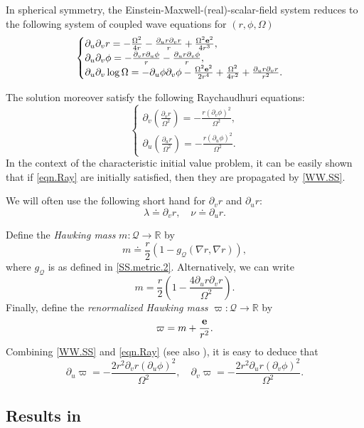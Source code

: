 \documentclass[10pt, reqno]{amsart}
\theoremstyle{definition}
\theoremstyle{remark}
\numberwithin{equation}{section}
\newcommand{\rd}{\partial}
\newcommand{\0}{\emptyset}
\newcommand{\Omg}{\Omega}
\newcommand{\f}{\frac}
\begin{document}
In spherical symmetry, the Einstein-Maxwell-(real)-scalar-field system reduces to the following system of coupled wave equations for $(r,\phi,\Omega)$
\begin{equation}\label{WW.SS}
\begin{cases}
\rd_u\rd_v r=-\f {\Omg^2}{4 r}-\f{\rd_u r\rd_v r}{r}+\f{\Omg^2 {\bf e}^2}{4r^3},\\
\rd_u\rd_v \phi=-\f{\rd_v r\rd_u\phi}{r}-\f{\rd_u r\rd_v\phi}{r},\\
\rd_u\rd_v\log\Omg=-\rd_u\phi\rd_v\phi-\f {\Omg^2 {\bf e}^2}{2 r^4}+\f{\Omg^2}{4r^2}+\f{\rd_u r\rd_v r}{r^2}.
\end{cases}
\end{equation}

The solution moreover satisfy the following Raychaudhuri equations:
\begin{equation}\label{eqn.Ray}
\begin{cases}
\rd_v(\f{\rd_v r}{\Omg^2})=-\f{r(\rd_v\phi)^2}{\Omg^2},\\
\rd_u(\f{\rd_u r}{\Omg^2})=-\f{r(\rd_u\phi)^2}{\Omg^2}.
\end{cases}
\end{equation}
In the context of the characteristic initial value problem, it can be easily shown that if \eqref{eqn.Ray} are initially satisfied, then they are propagated by \eqref{WW.SS}.

We will often use the following short hand for $\rd_v r$ and $\rd_u r$:
$$\lambda \doteq \rd_v r,\quad \nu \doteq \rd_u r.$$

Define the \emph{Hawking mass} $m:\mathcal Q\to \mathbb R$ by
$$m \doteq \f r2(1-g_{\mathcal Q}(\nabla r,\nabla r)),$$
where $g_{\mathcal Q}$ is as defined in \eqref{SS.metric.2}. Alternatively, we can write
$$m = \f r 2(1-\f{4\rd_u r\rd_v r}{\Omg^2}).$$
Finally, define the \emph{renormalized Hawking mass} $\varpi:\mathcal Q\to \mathbb R$ by 
\begin{equation}\label{eq:renormalized}
\varpi = m + \f{{\bf e}}{r^2}.
\end{equation}
Combining \eqref{WW.SS} and \eqref{eqn.Ray} (see also \cite[equation (2.8)]{LO.interior}), it is easy to deduce that
\begin{equation}\label{eq:varpi}
\rd_u\varpi=-\f{2 r^2 \rd_v r(\rd_u\phi)^2}{\Omg^2}, \quad \rd_v\varpi=-\f{2 r^2 \rd_u r(\rd_v\phi)^2}{\Omg^2}.
\end{equation}

\subsection{Results in \cite{LO.interior, LO.exterior}}\label{sec:the.old.LO.results}
\end{document}
